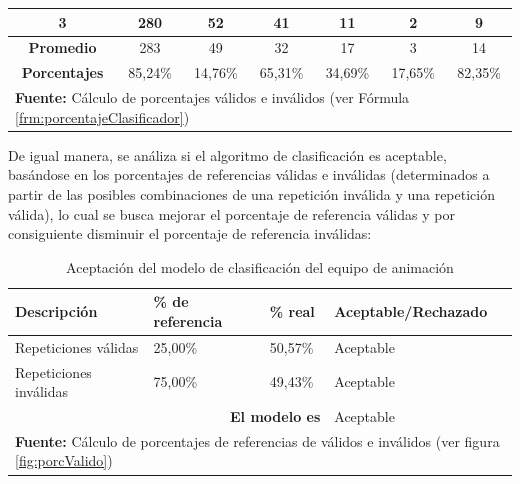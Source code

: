 \begin{table}[H]
\begin{center}
\begin{tabular}{|c|c|c|c|c|c|c|}
3                    & 280                                                                   & 52                                                             & 41                                               & 11                                                & 2                                                                      & 9                                                                      \\ \hline
\textbf{Promedio}    & 283                                                                   & 49                                                             & 32                                               & 17                                                & 3                                                                      & 14                                                                     \\ \hline
\textbf{Porcentajes} & 85,24\%                                                               & 14,76\%                                                        & 65,31\%                                          & 34,69\%                                           & 17,65\%                                                                & 82,35\%                                                                \\ \hline
\multicolumn{7}{l}{\textbf{Fuente:} C\'alculo de porcentajes v\'alidos e inv\'alidos (ver F\'ormula \ref{frm:porcentajeClasificador})}
\end{tabular}
\end{center}
\end{table}
De igual manera, se an\'aliza si el algoritmo de clasificaci\'on es aceptable, bas\'andose en los porcentajes de referencias v\'alidas e inv\'alidas (determinados a partir de las posibles combinaciones de una repetici\'on inv\'alida y una repetici\'on v\'alida), lo cual se busca mejorar el porcentaje de referencia v\'alidas y por  consiguiente disminuir el porcentaje de referencia inv\'alidas:
\begin{table}[H]
\begin{center}
\caption{Aceptaci\'on del modelo de clasificaci\'on del equipo de animaci\'on}
\label{tab:acModAni}
\begin{tabular}{|l|l|l|l|}
\hline
\textbf{Descripci\'on} & \textbf{\% de referencia} & \textbf{\% real} & \textbf{Aceptable/Rechazado} \\ \hline
Repeticiones v\'alidas              & 25,00\%                   & 50,57\%          & Aceptable                    \\ \hline
Repeticiones inv\'alidas            & 75,00\%                   & 49,43\%          & Aceptable                    \\ \hline
\multicolumn{3}{|r|}{\textbf{El modelo es}}                         & Aceptable                    \\ \hline 
\multicolumn{4}{l}{\textbf{Fuente:} C\'alculo de porcentajes de referencias de v\'alidos e inv\'alidos (ver figura  \ref{fig:porcValido})}
\end{tabular}
\end{center}
\end{table}
